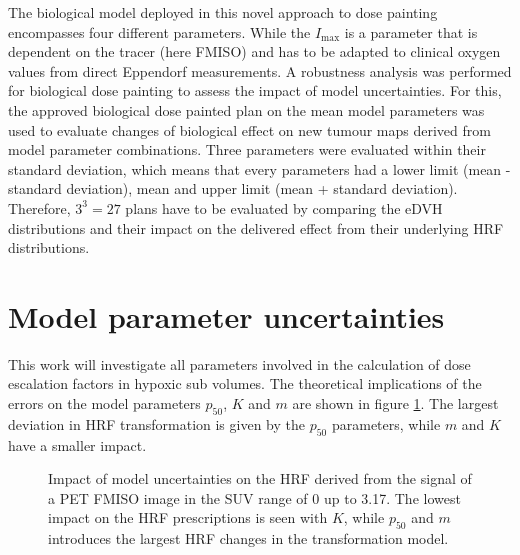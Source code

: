 The biological model deployed in this novel approach to dose painting encompasses four different parameters. While the $I_\mathrm{max}$ is a parameter that is dependent on the tracer (here FMISO) and has to be adapted to clinical oxygen values from direct Eppendorf measurements. A robustness analysis was performed for biological dose painting to assess the impact of model uncertainties. For this, the approved biological dose painted plan on the mean model parameters was used to evaluate changes of biological effect on new tumour maps derived from model parameter combinations. Three parameters were evaluated within their standard deviation, which means that every parameters had a lower limit (mean - standard deviation), mean and upper limit (mean + standard deviation). Therefore, $3^3=27$ plans have to be evaluated by comparing the eDVH distributions and their impact on the delivered effect from their underlying HRF distributions. 
\section{Model parameter uncertainties}
This work will investigate all parameters involved in the calculation of dose escalation factors in hypoxic sub volumes. The theoretical implications of the errors on the model parameters $p_{50}$, $K$ and $m$ are shown in figure \ref{fig:uncertaintyimpact}. The largest deviation in HRF transformation is given by the $p_{50}$ parameters, while $m$ and $K$ have a smaller impact. 
\begin{figure}[p]
\centering
{}
\hspace{0.3cm}
\hspace{0.3cm}
\hspace{0.3cm}
\hspace{0.3cm}
\caption{Impact of model uncertainties on the HRF derived from the signal of a PET FMISO image in the SUV range of 0 up to 3.17. The lowest impact on the HRF prescriptions is seen with $K$, while $p_{50}$ and $m$ introduces the largest HRF changes in the transformation model.}
\label{fig:uncertaintyimpact}
\end{figure}
